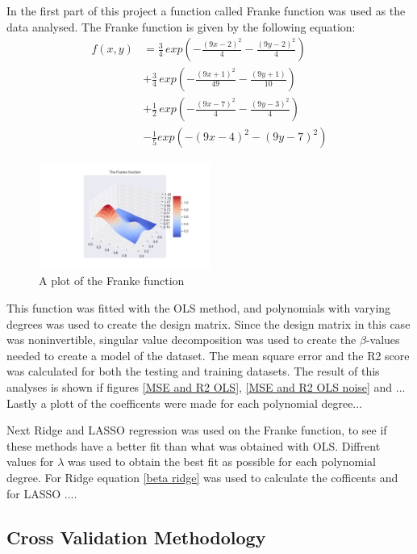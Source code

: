 \thispagestyle{plain}

\noindent In the first part of this project a function called Franke function
 was used as the data analysed. The Franke function is given by the following 
 equation:
\begin{align*}
    f(x,y) &= \frac{3}{4} \, exp\left(- \frac{(9x-2)^2}{4} - \frac{(9y-2)^2}{4}\right) \\
    &+ \frac{3}{4}\, exp\left( - \frac{(9x +1)^2}{49} - \frac{(9y+1)}{10}\right) \\
    &+ \frac{1}{2}\, exp\left( -\frac{(9x-7)^2}{4} - \frac{(9y-3)^2}{4}\right) \\
    &- \frac{1}{5} exp \left( - (9x -4)^2 - (9y-7)^2\right)
\end{align*}
\begin{figure}[H]
	\centering
	\includegraphics[width=0.5\textwidth]{Figure_1.png}
	\caption{\centering A plot of the Franke function }
	\label{Franke function}
\end{figure}
\noindent This function was fitted with the OLS method, 
and polynomials with varying degrees was used to create the design matrix.
Since the design matrix in this case was noninvertible, singular value 
decomposition was used to create the $\beta$-values needed to create a model
of the dataset. The mean square error and the R2 score was calculated 
for both the testing and training datasets. The result of this analyses is 
shown if figures \eqref{MSE and R2 OLS}, \eqref{MSE and R2 OLS noise} and ...
Lastly a plott of the coefficents were made for each polynomial degree...

\noindent Next Ridge and LASSO regression was used on the Franke function,
to see if these methods have a better fit than what was obtained with OLS.
Diffrent values for $\lambda$ was used to obtain the best fit as possible for each
polynomial degree. For Ridge equation \eqref{beta ridge} was used to calculate
the cofficents and for LASSO ....

\subsection{Cross Validation Methodology}

